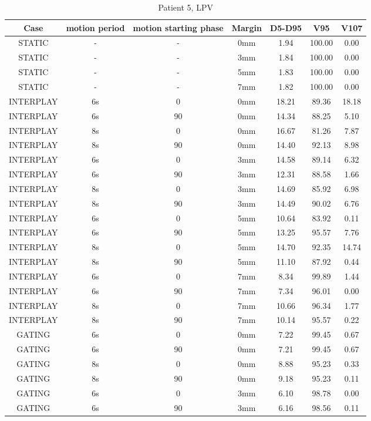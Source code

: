 \begin{table}[H]
  \centering
  \caption{Patient 5, LPV}
  \begin{tabular}{|c||c|c|c||c|c|c|}
    \hline\hline
    Case & motion period & motion starting phase & Margin & D5-D95 & V95 & V107\\
    \hline  
STATIC & - & - & 0mm & 1.94 & 100.00 & 0.00 \\
STATIC & - & - & 3mm & 1.84 & 100.00 & 0.00 \\
STATIC & - & - & 5mm & 1.83 & 100.00 & 0.00 \\
STATIC & - & - & 7mm & 1.82 & 100.00 & 0.00 \\
INTERPLAY & 6s & 0 & 0mm & 18.21 & 89.36 & 18.18 \\
INTERPLAY & 6s & 90 & 0mm & 14.34 & 88.25 & 5.10 \\
INTERPLAY & 8s & 0 & 0mm & 16.67 & 81.26 & 7.87 \\
INTERPLAY & 8s & 90 & 0mm & 14.40 & 92.13 & 8.98 \\
INTERPLAY & 6s & 0 & 3mm & 14.58 & 89.14 & 6.32 \\
INTERPLAY & 6s & 90 & 3mm & 12.31 & 88.58 & 1.66 \\
INTERPLAY & 8s & 0 & 3mm & 14.69 & 85.92 & 6.98 \\
INTERPLAY & 8s & 90 & 3mm & 14.49 & 90.02 & 6.76 \\
INTERPLAY & 6s & 0 & 5mm & 10.64 & 83.92 & 0.11 \\
INTERPLAY & 6s & 90 & 5mm & 13.25 & 95.57 & 7.76 \\
INTERPLAY & 8s & 0 & 5mm & 14.70 & 92.35 & 14.74 \\
INTERPLAY & 8s & 90 & 5mm & 11.10 & 87.92 & 0.44 \\
INTERPLAY & 6s & 0 & 7mm & 8.34 & 99.89 & 1.44 \\
INTERPLAY & 6s & 90 & 7mm & 7.34 & 96.01 & 0.00 \\
INTERPLAY & 8s & 0 & 7mm & 10.66 & 96.34 & 1.77 \\
INTERPLAY & 8s & 90 & 7mm & 10.14 & 95.57 & 0.22 \\
GATING & 6s & 0 & 0mm & 7.22 & 99.45 & 0.67 \\
GATING & 6s & 90 & 0mm & 7.21 & 99.45 & 0.67 \\
GATING & 8s & 0 & 0mm & 8.88 & 95.23 & 0.33 \\
GATING & 8s & 90 & 0mm & 9.18 & 95.23 & 0.11 \\
GATING & 6s & 0 & 3mm & 6.10 & 98.78 & 0.00 \\
GATING & 6s & 90 & 3mm & 6.16 & 98.56 & 0.11 \\

\end{tabular}
\end{table}
